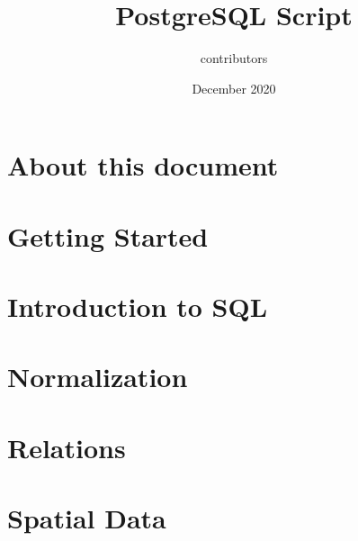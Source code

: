 \documentclass{article}
\title{PostgreSQL Script}
\author{contributors}
\date{December 2020}
\begin{document}
\maketitle

\section{About this document}

\section{Getting Started}

\section{Introduction to SQL}

\section{Normalization}

\section{Relations}

\section{Spatial Data}
\end{document}

